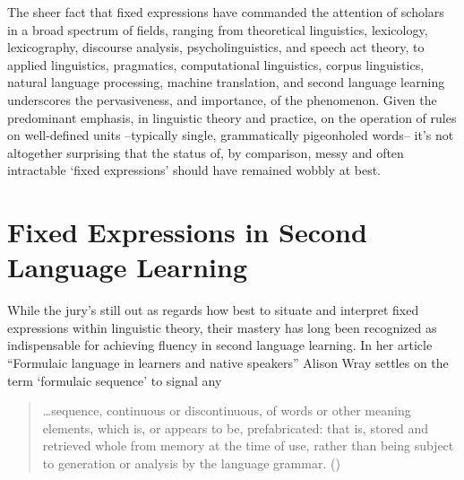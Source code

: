 \documentclass[output=paper]{langsci/langscibook}
\begin{document}
The sheer fact that fixed expressions have commanded the attention of scholars in a broad spectrum of fields, ranging from theoretical linguistics, lexicology, lexicography, discourse analysis, psycholinguistics, and speech act theory, to applied linguistics, pragmatics, computational linguistics, corpus linguistics, natural language processing, machine translation, and second language learning underscores the pervasiveness, and importance, of the phenomenon. Given the predominant emphasis, in linguistic theory and practice, on the operation of rules on well-defined units –typically single, grammatically pigeonholed words– it’s not altogether surprising that the status of, by comparison, messy and often intractable ‘fixed expressions’ should have remained wobbly at best. 

\section{Fixed Expressions in Second Language Learning}

While the jury’s still out as regards how best to situate and interpret fixed expressions within linguistic theory, their mastery has long been recognized as indispensable for achieving fluency in second language learning. In her article “Formulaic language in learners and native speakers” Alison Wray settles on the term ‘formulaic sequence’ to signal any 

\begin{quote}
    …sequence, continuous or discontinuous, of words or other meaning elements, which is, or appears to be, prefabricated: that is, stored and retrieved whole from memory at the time of use, rather than being subject to generation or analysis by the language grammar. (\citeyear[214]{wray_formulaic_1999})  
\end{quote}
\end{document}
